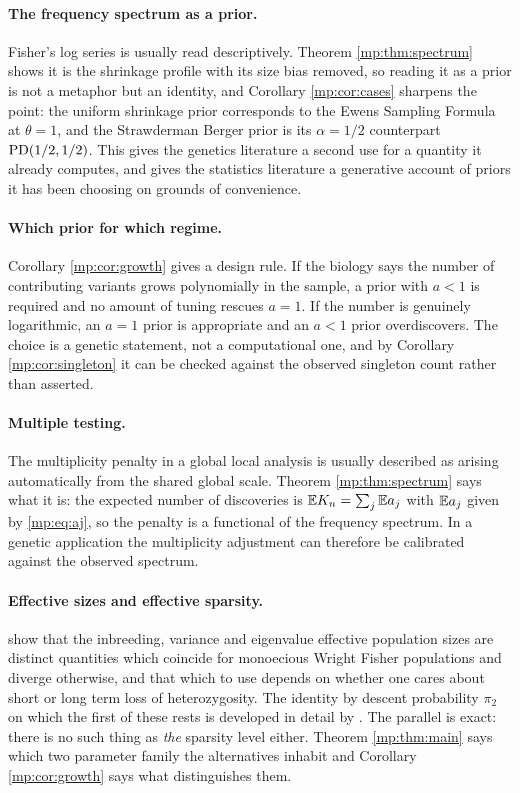 \paragraph{The frequency spectrum as a prior.} Fisher's log series is usually read
descriptively. Theorem \ref{mp:thm:spectrum} shows it is the shrinkage profile with its size bias removed, so
reading it as a prior is not a metaphor but an identity, and Corollary \ref{mp:cor:cases}
sharpens the point: the uniform shrinkage prior corresponds to the Ewens Sampling Formula at
$\theta=1$, and the Strawderman Berger prior is its $\alpha=1/2$ counterpart
$\mathrm{PD}(1/2,1/2)$. This gives the genetics literature a second use for a quantity it already
computes, and gives the statistics literature a generative account of priors it has been
choosing on grounds of convenience.

\paragraph{Which prior for which regime.} Corollary \ref{mp:cor:growth} gives a design rule. If
the biology says the number of contributing variants grows polynomially in the sample, a
prior with $a<1$ is required and no amount of tuning rescues $a=1$. If the number is
genuinely logarithmic, an $a=1$ prior is appropriate and an $a<1$ prior overdiscovers. The
choice is a genetic statement, not a computational one, and by Corollary \ref{mp:cor:singleton}
it can be checked against the observed singleton count rather than asserted.

\paragraph{Multiple testing.} The multiplicity penalty in a global local analysis is usually
described as arising automatically from the shared global scale. Theorem \ref{mp:thm:spectrum}
says what it is: the expected number of discoveries is $\mathbb{E} K_n=\sum_j\mathbb{E} a_j$ with $\mathbb{E} a_j$
given by \eqref{mp:eq:aj}, so the penalty is a functional of the frequency spectrum. In a
genetic application the multiplicity adjustment can therefore be calibrated against the
observed spectrum.

\paragraph{Effective sizes and effective sparsity.} \citet{mp:ewenshossjer2025} show that the
inbreeding, variance and eigenvalue effective population sizes are distinct quantities which
coincide for monoecious Wright Fisher populations and diverge otherwise, and that which to
use depends on whether one cares about short or long term loss of heterozygosity. The
identity by descent probability $\pi_2$ on which the first of these rests is developed in
detail by \citet{mp:thompson2013}. The
parallel is exact: there is no such thing as \emph{the} sparsity level either. Theorem
\ref{mp:thm:main} says which two parameter family the alternatives inhabit and Corollary
\ref{mp:cor:growth} says what distinguishes them.

